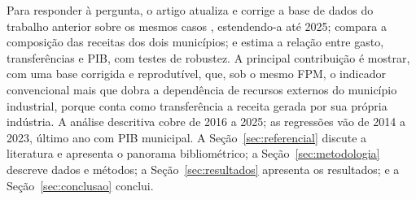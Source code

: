 Para responder à pergunta, o artigo atualiza e corrige a base de dados do trabalho anterior sobre os mesmos casos \citep{DutraP1}, estendendo-a até 2025; compara a composição das receitas dos dois municípios; e estima a relação entre gasto, transferências e PIB, com testes de robustez. A principal contribuição é mostrar, com uma base corrigida e reprodutível, que, sob o mesmo FPM, o indicador convencional mais que dobra a dependência de recursos externos do município industrial, porque conta como transferência a receita gerada por sua própria indústria. A análise descritiva cobre de 2016 a 2025; as regressões vão de 2014 a 2023, último ano com PIB municipal. A Seção~\ref{sec:referencial} discute a literatura e apresenta o panorama bibliométrico; a Seção~\ref{sec:metodologia} descreve dados e métodos; a Seção~\ref{sec:resultados} apresenta os resultados; e a Seção~\ref{sec:conclusao} conclui.
